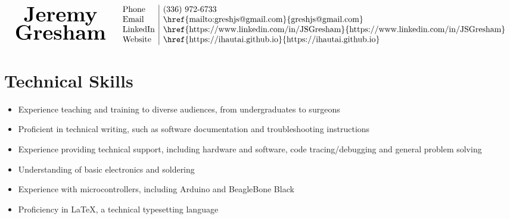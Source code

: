 \documentclass[10pt]{article}
\begin{document}
\begin{center}
  \[
\begin{array}{lr}
\begin{array}{cr}
\mbox{\bf\Huge Jeremy} \\
\mbox{\bf\Huge Gresham}
\end{array} &
\begin{array}{l|l}
\setlength{\arraycolsep}{1pt}
\mbox{Phone} & $(336) 972-6733$ \\
\mbox{Email} & $\href{mailto:greshjs@gmail.com}{greshjs@gmail.com}$ \\
\mbox{LinkedIn} & $\href{https://www.linkedin.com/in/JSGresham}{https://www.linkedin.com/in/JSGresham}$ \\
\mbox{Website} & $\href{https://ihautai.github.io}{https://ihautai.github.io}$ \\
\end{array}
\end{array}
\]

\end{center}


\section*{Technical Skills}

\begin{itemize}
\setlength{\itemsep}{0pt}
\item Experience teaching and training to diverse audiences, from undergraduates to surgeons

\item Proficient in technical writing, such as software documentation and troubleshooting instructions

\item Experience providing technical support, including hardware and software, code tracing/debugging and general problem solving

\item Understanding of basic electronics and soldering

\item Experience with microcontrollers, including Arduino and BeagleBone Black

\item Proficiency in {\rmfamily \LaTeX}, a technical typesetting language
  
\end{itemize}
\end{document}
